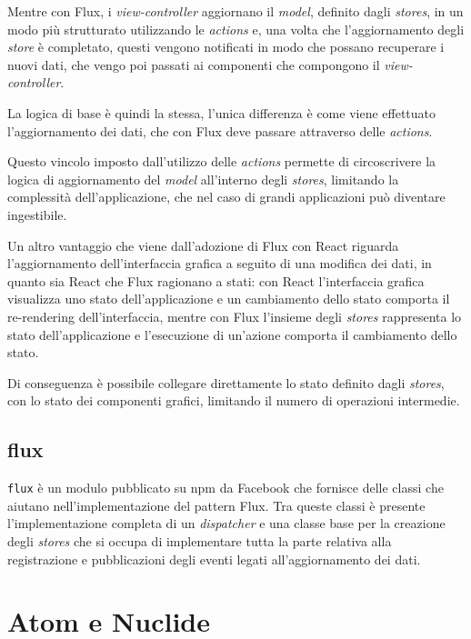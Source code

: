 Mentre con Flux, i \textit{view-controller} aggiornano il \textit{model}, definito dagli \textit{stores}, in un modo più strutturato utilizzando le \textit{actions} e, una volta che l'aggiornamento degli \textit{store} è completato, questi vengono notificati in modo che possano recuperare i nuovi dati, che vengo poi passati ai componenti che compongono il \textit{view-controller}.

La logica di base è quindi la stessa, l'unica differenza è come viene effettuato l'aggiornamento dei dati, che con Flux deve passare attraverso delle \textit{actions}.

Questo vincolo imposto dall'utilizzo delle \textit{actions} permette di circoscrivere la logica di aggiornamento del \textit{model} all'interno degli \textit{stores}, limitando la complessità dell'applicazione, che nel caso di grandi applicazioni può diventare ingestibile.

Un altro vantaggio che viene dall'adozione di Flux con React riguarda l'aggiornamento dell'interfaccia grafica a seguito di una modifica dei dati, in quanto sia React che Flux ragionano a stati: con React l'interfaccia grafica visualizza uno stato dell'applicazione e un cambiamento dello stato comporta il re-rendering dell'interfaccia, mentre con Flux l'insieme degli \textit{stores} rappresenta lo stato dell'applicazione e l'esecuzione di un'azione comporta il cambiamento dello stato.

Di conseguenza è possibile collegare direttamente lo stato definito dagli \textit{stores}, con lo stato dei componenti grafici, limitando il numero di operazioni intermedie.

\subsection{flux}\label{sec:flux-npm}

\texttt{flux} è un modulo pubblicato su npm da Facebook che fornisce delle classi che aiutano nell'implementazione del pattern Flux.
Tra queste classi è presente l'implementazione completa di un \textit{dispatcher} e una classe base per la creazione degli \textit{stores} che si occupa di implementare tutta la parte relativa alla registrazione e pubblicazioni degli eventi legati all'aggiornamento dei dati.


\section{Atom e Nuclide}

